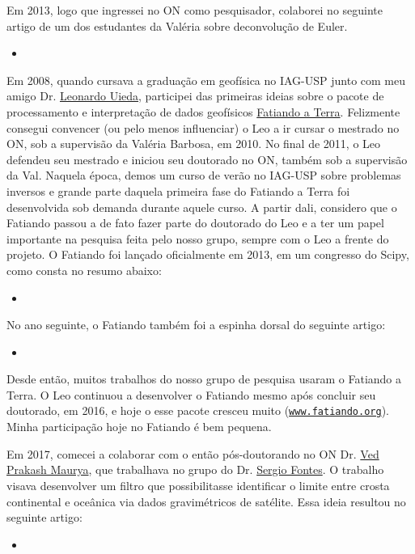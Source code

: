 Em 2013, logo que ingressei no ON como pesquisador, colaborei no seguinte artigo de um dos
estudantes da Valéria sobre deconvolução de Euler.
\begin{itemize}
	\item {}
\end{itemize}

\bigskip

\noindent Em 2008, quando cursava a graduação em geofísica no IAG-USP junto com meu amigo
Dr. \href{https://www.leouieda.com/}{Leonardo Uieda}, participei das primeiras ideias 
sobre o pacote de processamento e interpretação de dados geofísicos 
\href{https://www.fatiando.org/about/}{\textsf{Fatiando a Terra}}. 
Felizmente consegui convencer (ou pelo menos influenciar) o Leo a ir cursar o mestrado
no ON, sob a supervisão da Valéria Barbosa, em 2010. 
No final de 2011, o Leo defendeu seu mestrado e iniciou seu doutorado no ON,
também sob a supervisão da Val.
Naquela época, demos um curso de verão no IAG-USP sobre problemas inversos e
grande parte daquela primeira fase do Fatiando a Terra foi desenvolvida sob demanda
durante aquele curso.
A partir dali, considero que o Fatiando passou a de fato fazer parte do doutorado 
do Leo e a ter um papel importante na pesquisa feita pelo nosso grupo, sempre com o Leo
a frente do projeto. O Fatiando foi lançado oficialmente em 2013, em um congresso
do Scipy, como consta no resumo abaixo:
\begin{itemize}
	\item {}
\end{itemize}
No ano seguinte, o Fatiando também foi a espinha dorsal do seguinte artigo:
\begin{itemize}
	\item {}
\end{itemize}
Desde então, muitos trabalhos do nosso grupo de pesquisa usaram o Fatiando a Terra.
O Leo continuou a desenvolver o Fatiando mesmo após concluir seu doutorado, em 2016,
e hoje o esse pacote cresceu muito 
(\href{https://www.fatiando.org/about/}{\texttt{www.fatiando.org}}).
Minha participação hoje no Fatiando é bem pequena.

\bigskip

\noindent Em 2017, comecei a colaborar com o então pós-doutorando no ON Dr.
\href{https://www.researchgate.net/profile/Ved-Maurya}{Ved Prakash Maurya},
que trabalhava no grupo do Dr. 
\href{https://lattes.cnpq.br/8537150955145617}{Sergio Fontes}.
O trabalho visava desenvolver um filtro que possibilitasse identificar o 
limite entre crosta continental e oceânica via dados gravimétricos de satélite.
Essa ideia resultou no seguinte artigo:
\begin{itemize}
	\item {}
\end{itemize}

